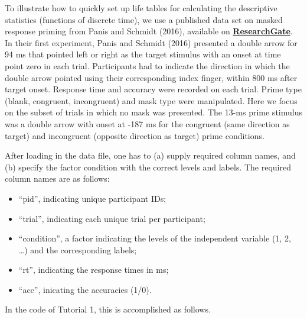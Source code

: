 \documentclass[
  man,floatsintext]{apa6}
\providecommand{\tightlist}{%
  \setlength{\itemsep}{0pt}\setlength{\parskip}{0pt}}
\begin{document}
To illustrate how to quickly set up life tables for calculating the descriptive statistics (functions of discrete time), we use a published data set on masked response priming from Panis and Schmidt (2016), available on \href{https://www.researchgate.net/publication/304069212_What_Is_Shaping_RT_and_Accuracy_Distributions_Active_and_Selective_Response_Inhibition_Causes_the_Negative_Compatibility_Effect}{\textbf{ResearchGate}}.
In their first experiment, Panis and Schmidt (2016) presented a double arrow for 94 ms that pointed left or right as the target stimulus with an onset at time point zero in each trial. Participants had to indicate the direction in which the double arrow pointed using their corresponding index finger, within 800 ms after target onset. Response time and accuracy were recorded on each trial. Prime type (blank, congruent, incongruent) and mask type were manipulated. Here we focus on the subset of trials in which no mask was presented. The 13-ms prime stimulus was a double arrow with onset at -187 ms for the congruent (same direction as target) and incongruent (opposite direction as target) prime conditions.

After loading in the data file, one has to (a) supply required column names, and (b) specify the factor condition with the correct levels and labels.
The required column names are as follows:

\begin{itemize}
\tightlist
\item
  ``pid'', indicating unique participant IDs;
\item
  ``trial'', indicating each unique trial per participant;
\item
  ``condition'', a factor indicating the levels of the independent variable (1, 2, \ldots) and the corresponding labels;
\item
  ``rt'', indicating the response times in ms;
\item
  ``acc'', inicating the accuracies (1/0).
\end{itemize}

In the code of Tutorial 1, this is accomplished as follows.

\scriptsize
\end{document}
